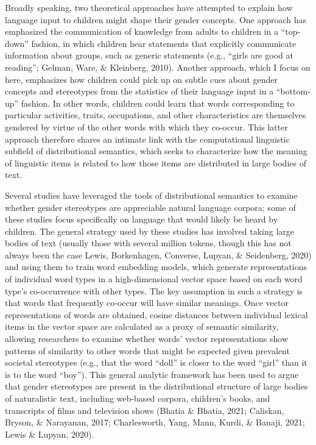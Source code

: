 \documentclass[10pt, letterpaper]{article}
\begin{document}
Broadly speaking, two theoretical approaches have attempted to explain
how language input to children might shape their gender concepts. One
approach has emphasized the communication of knowledge from adults to
children in a ``top-down'' fashion, in which children hear statements
that explicitly communicate information about groups, such as generic
statements (e.g., {``girls are good at reading''}; Gelman, Ware, \&
Kleinberg, 2010). Another approach, which I focus on here, emphasizes
how children could pick up on subtle cues about gender concepts and
stereotypes from the statistics of their language input in a
``bottom-up'' fashion. In other words, children could learn that words
corresponding to particular activities, traits, occupations, and other
characteristics are themselves gendered by virtue of the other words
with which they co-occur. This latter approach therefore shares an
intimate link with the computational linguistic subfield of
distributional semantics, which seeks to characterize how the meaning of
linguistic items is related to how those items are distributed in large
bodies of text.

Several studies have leveraged the tools of distributional semantics to
examine whether gender stereotypes are appreciable natural language
corpora; some of these studies focus specifically on language that would
likely be heard by children. The general strategy used by these studies
has involved taking large bodies of text (usually those with several
million tokens, though this has not always been the case Lewis,
Borkenhagen, Converse, Lupyan, \& Seidenberg, 2020) and using them to
train word embedding models, which generate representations of
individual word types in a high-dimensional vector space based on each
word type's co-occurrence with other types. The key assumption in such a
strategy is that words that frequently co-occur will have similar
meanings. Once vector representations of words are obtained, cosine
distances between individual lexical items in the vector space are
calculated as a proxy of semantic similarity, allowing researchers to
examine whether words' vector representations show patterns of
similarity to other words that might be expected given prevalent
societal stereotypes (e.g., that the word ``doll'' is closer to the word
``girl'' than it is to the word ``boy''). This general analytic
framework has been used to argue that gender stereotypes are present in
the distributional structure of large bodies of naturalistic text,
including web-based corpora, children's books, and transcripts of films
and television shows (Bhatia \& Bhatia, 2021; Caliskan, Bryson, \&
Narayanan, 2017; Charlesworth, Yang, Mann, Kurdi, \& Banaji, 2021; Lewis
\& Lupyan, 2020).
\end{document}
